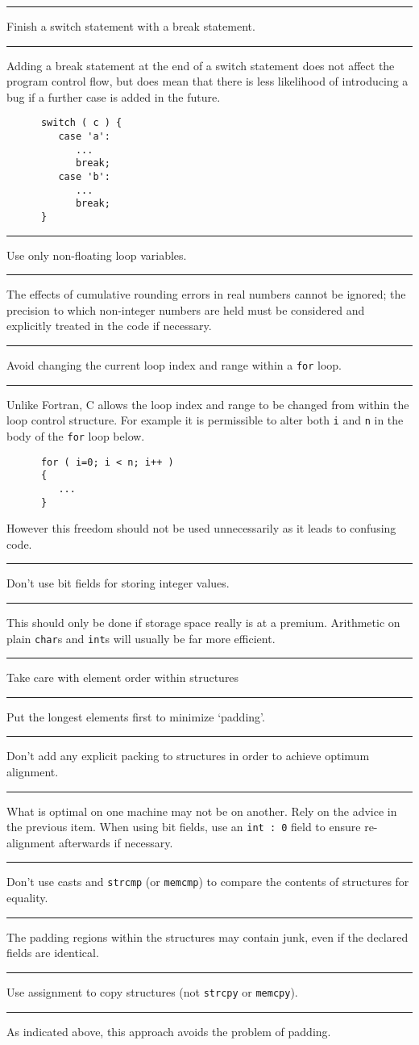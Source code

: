 \documentclass[twoside,11pt]{article}
\newcounter{sruleno}
\newcommand{\srule}[1]{
    \addtocounter{sruleno}{1}
    \goodbreak
    \rule[0.5ex]{\textwidth}{0.3mm}
    {\Large #1 \hfill {\thesruleno}}
    \rule[0.5ex]{\textwidth}{0.1mm}
}
\newcommand{\srule}[1]{
       \addtocounter{sruleno}{1}
       \begin{rawhtml} <HR> \end{rawhtml}
       {\Large \thesruleno}~~~~{\Large #1}
       \begin{rawhtml} <HR> \end{rawhtml}
       \end{tabular}
  }
\begin{document}
\srule{Finish a switch statement with a break statement.}
Adding a break statement at the end of a switch statement does not
affect the program control flow, but does mean that there
is less likelihood of introducing a bug if a further case is added
in the future. 
\begin{verbatim}
      switch ( c ) {
         case 'a':
            ...
            break;
         case 'b':
            ...
            break;
      }
\end{verbatim}


\srule{Use only non-floating loop variables.}
The effects of cumulative rounding errors in real numbers cannot be ignored; 
the precision to which non-integer numbers are held must be considered and 
explicitly treated in the code if necessary.


\srule{Avoid changing the current loop index and range within a 
{\tt for} loop.}
Unlike Fortran, C allows the loop index  and range to be changed 
from within the loop control structure.
For example it is permissible to alter both {\tt i} and {\tt n}
in the body of the {\tt for} loop below.
\begin{verbatim}
      for ( i=0; i < n; i++ )
      {                       
         ...
      }
\end{verbatim}          
However this freedom should not be used unnecessarily as it leads to 
confusing code.



\srule{Don't use bit fields for storing integer values.}
This should only be done if storage space  
really is at a premium. Arithmetic on plain \verb~char~s and 
\verb~int~s will usually be far more efficient.

\srule{Take care with element order within structures}
Put the longest elements first to minimize `padding'.

\srule{Don't add any explicit packing to structures in order to achieve optimum 
alignment.}
What is optimal on one machine may not be on another. Rely 
on the advice in the previous item.
When using bit fields, use an {\tt int~:~0}
field to ensure re-alignment afterwards if necessary.



\srule{Don't use casts and {\tt strcmp} (or {\tt memcmp}) to compare the contents of 
structures for equality.}
The padding regions within the structures may 
contain junk, even if the declared fields are identical.

\srule{Use assignment to copy structures (not {\tt strcpy} or {\tt memcpy}).}
As indicated above, this approach avoids the problem of padding.
\end{document}

